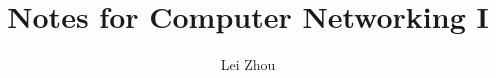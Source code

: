 \documentclass{article}
\begin{document}
\title{Notes for Computer Networking I}
\author{Lei Zhou}
\maketitle


\end{document}
